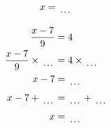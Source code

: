 \documentclass[12pt]{article}
\newcounter{minipagecount}
\begin{document}
\begin{multicols}{2}
\begin{minipage}[t]{0.45\textwidth}
\begin{align*}
        x &= \dotuline{\hspace{5mm}}\\
    \end{align*}
\end{minipage}\columnbreak
\noindent{(\theminipagecount)}\hspace{0.1mm} %
\begin{minipage}[t]{0.45\textwidth} %
    \vspace{-26pt}  %
    \raggedright %
    \begin{align*} %
        \frac{x - 7}{9} &= 4\\
        \frac{x - 7}{9} \times\dotuline{\hspace{5mm}} &= 4 \times\dotuline{\hspace{5mm}}\\
        x - 7 &= \dotuline{\hspace{5mm}}\\
        x - 7 + \dotuline{\hspace{5mm}} &= \dotuline{\hspace{5mm}} + \dotuline{\hspace{5mm}}\\
        x &= \dotuline{\hspace{5mm}}\\
    \end{align*}
\end{minipage} %
\noindent{(\theminipagecount)}\hspace{0.1mm} %
\begin{minipage}[t]{0.45\textwidth} %
    \vspace{-26pt}  %

\end{minipage}
\end{multicols}
\end{document}
